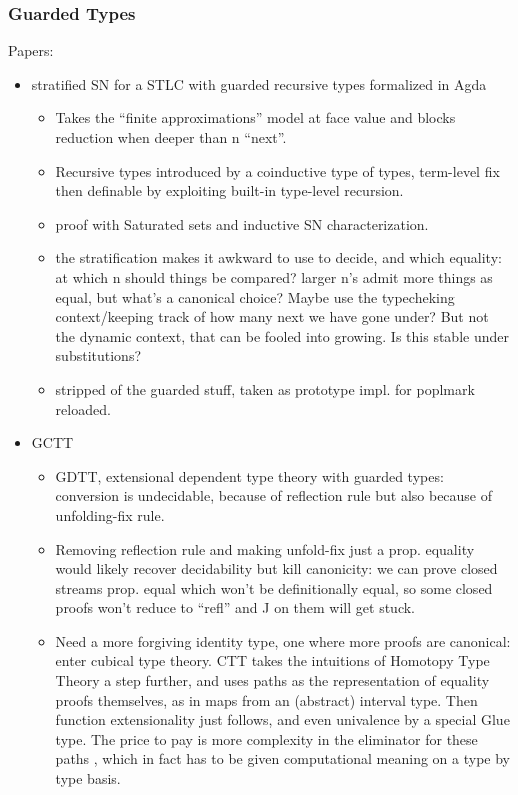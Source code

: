 \documentclass{book}
\begin{document}
\subsubsection{Guarded Types}
Papers:  
\begin{itemize}
  
\item stratified SN for a STLC with guarded recursive types formalized in Agda
  \begin{itemize}
    \item Takes the ``finite approximations'' model at face value and blocks reduction when deeper than n ``next''.
    \item Recursive types introduced by a coinductive type of types, term-level fix then definable by exploiting built-in type-level recursion.
    \item proof with Saturated sets and inductive SN characterization.
    
    \item the stratification makes it awkward to use to decide, and which
    equality: at which n should things be compared? larger n's admit
    more things as equal, but what's a canonical choice?
    Maybe use the typecheking context/keeping track of how many next
    we have gone under? But not the dynamic context, that can be
    fooled into growing. Is this stable under substitutions?    
    \item stripped of the guarded stuff, taken as prototype impl. for poplmark reloaded.
  \end{itemize}
\item GCTT
  \begin{itemize}
    \item GDTT, extensional dependent type theory with guarded types:
    conversion is undecidable, because of reflection rule but also
    because of unfolding-fix rule.
    
    \item Removing reflection rule and making unfold-fix just a
    prop. equality would likely recover decidability but kill
    canonicity: we can prove closed streams prop. equal which won't be
    definitionally equal, so some closed proofs won't reduce to
    ``refl'' and J on them will get stuck.

    \item Need a more forgiving identity type, one where more proofs are
    canonical: enter cubical type theory.
    CTT takes the intuitions of Homotopy Type Theory a step
     further, and uses paths as the representation of equality proofs themselves,
     as in maps from an (abstract) interval type.
     Then function extensionality just follows, and even univalence by a special Glue type.
     The price to pay is more complexity in the eliminator for these paths
     , which in fact has to be given computational meaning on a type by type basis.


\end{itemize}
\end{itemize}
\end{document}
